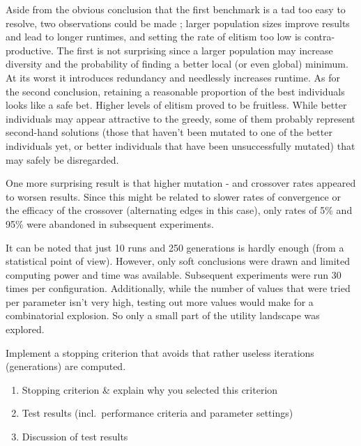 \par\noindent Aside from the obvious conclusion that the first benchmark is a tad too easy to resolve, two observations could be made ; larger population sizes improve results and lead to longer runtimes, and setting the rate of elitism too low is contra-productive. The first is not surprising since a larger population may increase diversity and the probability of finding a better local (or even global) minimum. At its worst it introduces redundancy and needlessly increases runtime. As for the second conclusion, retaining a reasonable proportion of the best individuals looks like a safe bet. Higher levels of elitism proved to be fruitless. While better individuals may appear attractive to the greedy, some of them probably represent second-hand solutions (those that haven't been mutated to one of the better individuals yet, or better individuals that have been unsuccessfully mutated) that may safely be disregarded.\\

\par\noindent One more surprising result is that higher mutation - and crossover rates appeared to worsen results. Since this might be related to slower rates of convergence or the efficacy of the crossover (alternating edges in this case), only rates of 5\% and 95\% were abandoned in subsequent experiments.\\

\par\noindent It can be noted that just 10 runs and 250 generations is hardly enough (from a statistical point of view). However, only soft conclusions were drawn and limited computing power and time was available. Subsequent experiments were run 30 times per configuration. Additionally, while the number of values that were tried per parameter isn't very high, testing out more values would make for a combinatorial explosion. So only a small part of the utility landscape was explored.

Implement a stopping criterion that avoids that rather useless iterations (generations) are computed.
\begin{enumerate}
\item	 Stopping criterion \& explain why you selected this criterion
\item Test results (incl.\ performance criteria and parameter settings)
\item Discussion of test results

\end{enumerate}

